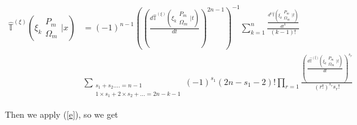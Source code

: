 \begin{align}
        \hat{\mathbb{T}}^{(\xi)}\left( \xi_k \begin{matrix} P_m \\ \Omega_m 
        \end{matrix} \bigg| x  \right) &= (-1)^{n-1}\left(\left(\frac{d\hat{
        \mathbb{T}}^{(\xi)}\left( \xi_k \begin{matrix} P_m \\ \Omega_m \end{matrix}
        \bigg| t  \right)}{dt}\right)^{2n-1}\right)^{-1}\sum_{k=1}^n \frac{\frac{d^k
        \hat{\mathbb{T}}\left( \xi_k \begin{matrix} P_m \\ \Omega_m \end{matrix} \bigg|
        t  \right)}{dt^k}}{(k-1)!} \\
        &\sum_{\substack{s_1 + s_2 . ... = n-1 \\ 1\times s_1 + 2 \times s_2 + ... = 
        2n-k-1}}(-1)^{s_1}(2n-s_1-2)! \prod_{r=1}\frac{(\frac{d\hat{\mathbb{T}}^{(\xi)}
        \left( \xi_k \begin{matrix} P_m \\ \Omega_m \end{matrix} \bigg| t  
        \right)}{dt})^{s_r}}{(r!)^{s_r}s_r!}
\end{align}

Then we apply (\ref{e}), so we get


